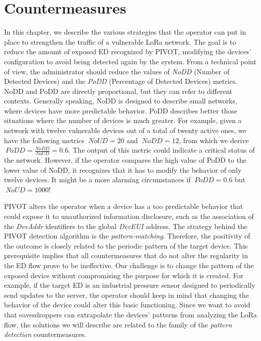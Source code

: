 \chapter{Countermeasures}
\label{countermeasures}
In this chapter, we describe the various strategies that the operator can put in place to strengthen the traffic of a vulnerable LoRa network. The goal is to reduce the amount of exposed ED recognized by PIVOT, modifying the devices' configuration to avoid being detected again by the system. From a technical point of view, the administrator should reduce the values of \textit{NoDD} (Number of Detected Devices) and the  \textit{PoDD} (Percentage of Detected Devices) metrics. NoDD and PoDD are directly proportional, but they can refer to different contexts. Generally speaking, NoDD is designed to describe small networks, where devices have more predictable behavior. PoDD describes better those situations where the number of devices is much greater. For example, given a network with twelve vulnerable devices out of a total of twenty active ones, we have the following metrics \(\ NoUD = 20 \) and \(\ NoDD = 12 \), from which we derive \(\ PoDD = \frac{NoDD}{NoUD} = 0.6 \). The output of this metric could indicate a critical status of the network. However, if the operator compares the high value of PoDD to the lower value of NoDD, it recognizes that it has to modify the behavior of only twelve devices. It might be a more alarming circumstances if \(\ PoDD = 0.6 \) but \(\ NoUD = 1000 \)!

\vspace{5mm} %

PIVOT alters the operator when a device has a too predictable behavior that could expose it to unauthorized information disclosure, such as the association of the \textit{DevAddr} identifiers to the global \textit{DevEUI} address. The strategy behind the PIVOT detection algorithm is the \textit{pattern-matching}. Therefore, the positivity of the outcome is closely related to the periodic pattern of the target device. This prerequisite implies that all countermeasures that do not alter the regularity in the ED flow prove to be ineffective. Our challenge is to change the pattern of the exposed device without compromising the purpose for which it is created.  For example, if the target ED is an industrial pressure sensor designed to periodically send updates to the server, the operator should keep in mind that changing the behavior of the device could alter this basic functioning. Since we want to avoid that eavesdroppers can extrapolate the devices' patterns from analyzing the LoRa flow, the solutions we will describe are related to the family of the \textit{pattern detection} countermeasures.

